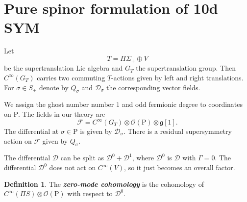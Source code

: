 \documentclass[12pt]{amsart}
\newcommand{\cD}{\mathcal{D}}
\newcommand{\cF}{\mathcal{F}}
\newcommand{\g}{\mathfrak{g}}
\newcommand{\cO}{\mathcal{O}}
\renewcommand{\P}{\mathrm{P}}
\theoremstyle{definition}
\newtheorem{defn}[thm]{Definition}
\theoremstyle{remark}
\newcommand{\defterm}[1]{\textbf{\emph{#1}}}
\begin{document}
\section{Pure spinor formulation of 10d SYM}

Let
\[T = \Pi\Sigma_+\oplus V\]
be the supertranslation Lie algebra and $G_T$ the supertranslation group. Then $C^\infty(G_T)$ carries two commuting $T$-actions given by left and right translations. For $\sigma\in S_+$ denote by $Q_\sigma$ and $\cD_\sigma$ the corresponding vector fields.

We assign the ghost number number $1$ and odd fermionic degree to coordinates on $\P$. The fields in our theory are
\[\cF = C^\infty(G_T)\otimes \cO(\P)\otimes \g[1].\]
The differential at $\sigma\in \P$ is given by $\cD_\sigma$. There is a residual supersymmetry action on $\cF$ given by $Q_\sigma$.

The differential $\cD$ can be split as $\cD^0 + \cD^1$, where $\cD^0$ is $\cD$ with $\Gamma=0$. The differential $\cD^0$ does not act on $C^\infty(V)$, so it just becomes an overall factor.

\begin{defn}
The \defterm{zero-mode cohomology} is the cohomology of $C^\infty(\Pi S)\otimes \cO(\P)$ with respect to $\cD^0$.
\end{defn}
\end{document}

